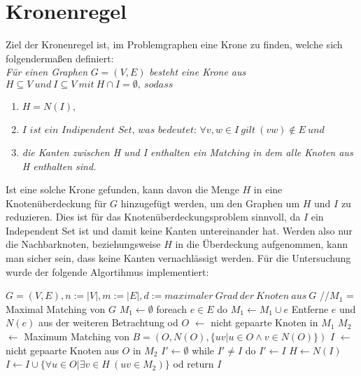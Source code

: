 \section{Kronenregel}
\label{ch:Grundlagen:sec:Kronenregel}
Ziel der Kronenregel ist, im Problemgraphen eine Krone zu finden, welche sich folgendermaßen definiert:\\
\textit{Für einen Graphen} $G=(V,E)$ \textit{besteht eine Krone aus} $H \subseteq V\ und\ I \subseteq V\ mit\ H \cap I = \emptyset,\ sodass$ 
\begin{enumerate}
\item $H = N(I),$ 
\item $\textit{I ist ein Indipendent Set, was bedeutet: }\forall v, w \in I\ gilt\ (vw) \notin E\ und$
\item \textit{die Kanten zwischen H und I enthalten ein Matching in dem alle Knoten aus H enthalten sind.}
\end{enumerate}
Ist eine solche Krone gefunden, kann davon die Menge $H$ in eine Knotenüberdeckung für $G$ hinzugefügt werden, um den Graphen um $H$ und $I$ zu reduzieren. Dies ist für das Knotenüberdeckungsproblem sinnvoll, da $I$ ein Independent Set ist und damit keine Kanten untereinander hat. Werden also nur die Nachbarknoten, beziehungsweise $H$ in die Überdeckung aufgenommen, kann man sicher sein, dass keine Kanten vernachlässigt werden. Für die Untersuchung wurde der folgende Algortihmus implementiert:

\begin{algorithm}[caption={Kronenregel.}, label={alg2}]
$G = (V, E), n:= |V|, m:=|E|, d:= maximaler\ Grad\ der\ Knoten\ aus\ G$
//$M_{1}$ = Maximal Matching von $G$
  $M_{1} \leftarrow \emptyset$
  foreach $e \in E$ do
    $M_{1} \leftarrow M_{1} \cup e$
    Entferne $e$ und $N(e)$ aus der weiteren Betrachtung
  od
$O$ $\leftarrow$ nicht gepaarte Knoten in $M_{1}$
$M_{2}$ $\leftarrow$ Maximum Matching von $B = (O, N(O), \{ uv| u \in O \wedge v \in N(O)\}) $
$I$ $\leftarrow$ nicht gepaarte Knoten aus $O$ in $M_{2}$
$I'  \leftarrow \emptyset$
while $I' \neq I$ do
  $I' \leftarrow I$
  $H \leftarrow N(I)$
  $I \leftarrow I \cup \{\forall u \in O|\exists v\in H\ (uv \in M_{2})\}$
od
return $I$
\end{algorithm}

